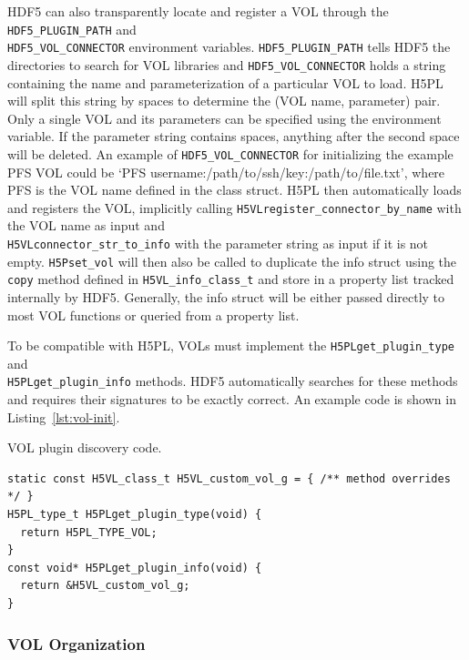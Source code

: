 HDF5 can also transparently locate and register a VOL through the \texttt{HDF5\_PLUGIN\_PATH} and \\ \texttt{HDF5\_VOL\_CONNECTOR} environment variables. \texttt{HDF5\_PLUGIN\_PATH} tells HDF5 the directories to search for VOL libraries and \texttt{HDF5\_VOL\_CONNECTOR} holds a string containing the name and parameterization of a particular VOL to load. H5PL will split this string by spaces to determine the (VOL name, parameter) pair. Only a single VOL and its parameters can be specified using the environment variable. If the parameter string contains spaces, anything after the second space will be deleted. An example of \texttt{HDF5\_VOL\_CONNECTOR} for initializing the example PFS VOL could be `PFS username:/path/to/ssh/key:/path/to/file.txt', where PFS is the VOL name defined in the class struct. H5PL then automatically loads and registers the VOL, implicitly calling \texttt{H5VLregister\_connector\_by\_name} with the VOL name as input and \\ \texttt{H5VLconnector\_str\_to\_info} with the parameter string as input if it is not empty. \texttt{H5Pset\_vol} will then also be called to duplicate the info struct using the \texttt{copy} method defined in \texttt{H5VL\_info\_class\_t} and store in a property list tracked internally by HDF5. Generally, the info struct will be either passed directly to most VOL functions or queried from a property list.

To be compatible with H5PL, VOLs must implement the \texttt{H5PLget\_plugin\_type} and \\ \texttt{H5PLget\_plugin\_info} methods. HDF5 automatically searches for these methods and requires their signatures to be exactly correct. An example code is shown in Listing~\ref{lst:vol-init}.

\begin{listing}[!ht]
\centering
\caption{VOL plugin discovery code.}
\label{lst:vol-init}
\begin{verbatim}
static const H5VL_class_t H5VL_custom_vol_g = { /** method overrides */ }
H5PL_type_t H5PLget_plugin_type(void) {
  return H5PL_TYPE_VOL;
}
const void* H5PLget_plugin_info(void) {
  return &H5VL_custom_vol_g;
}
\end{verbatim}
\end{listing}

\subsubsection{VOL Organization}

